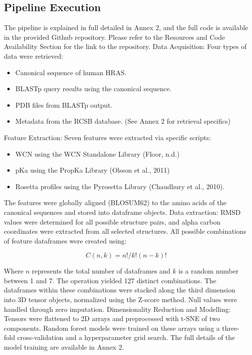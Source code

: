 \documentclass{article}
\begin{document}
\subsection{Pipeline Execution}
The pipeline is explained in full detailed in Annex 2, and the full code is available in the provided Github repository. Please refer to the Resources and Code Availability Section for the link to the repository.
Data Acquisition: Four types of data were retrieved:
 \begin{itemize}
     \item Canonical sequence of human HRAS.
     \item BLASTp query results using the canonical sequence.
     \item PDB files from BLASTp output.
     \item Metadata from the RCSB database. (See Annex 2 for retrieval specifics)
 \end{itemize}
 
Feature Extraction: Seven features were extracted via specific scripts:
 \begin{itemize}
     \item WCN using the WCN Standalone Library (Floor, n.d.)
     \item pKa using the PropKa Library (Olsson et al., 2011)
     \item Rosetta profiles using the Pyrosetta Library (Chaudhury et al., 2010).
 \end{itemize}
 
The features were globally aligned (BLOSUM62) to the amino acids of the canonical sequences and stored into dataframe objects.
Data extraction: RMSD values were determined for all possible structure pairs, and alpha carbon coordinates were extracted from all selected structures. All possible combinations of feature dataframes were created using:


\[C(n,k)=n!/k!(n-k)!\]


Where \(n\) represents the total number of dataframes and \(k\) is a random number between 1 and 7. The operation yielded 127 distinct combinations.
The dataframes within these combinations were stacked along the third dimension into 3D tensor objects, normalized using the Z-score method. Null values were handled through zero imputation.
Dimensionality Reduction and Modelling: Tensors were flattened to 2D arrays and preprocessed with t-SNE of two components. Random forest models were trained on these arrays using a three-fold cross-validation and a hyperparameter grid search. The full details of the model training are available in Annex 2.
\end{document}
